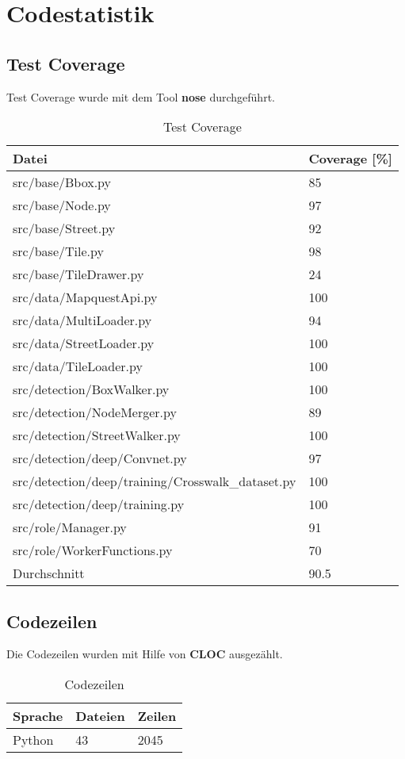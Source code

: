 \section{Codestatistik}
\subsection{Test Coverage}
Test Coverage wurde mit dem Tool \textbf{nose} durchgeführt. \\

\begin{table}[H]
\centering
    \begin{tabular}{|l|l|}
    \hline    
    \rowcolor{lightblue}
	Datei & Coverage [\%] \\ \hline
	src/base/Bbox.py & 85 \\ \hline    
	src/base/Node.py & 97 \\ \hline   
	src/base/Street.py & 92 \\ \hline  
	src/base/Tile.py & 98 \\ \hline   
	src/base/TileDrawer.py & 24 \\ \hline  
	src/data/MapquestApi.py & 100 \\ \hline   
	src/data/MultiLoader.py & 94 \\ \hline   
	src/data/StreetLoader.py & 100 \\ \hline   
	src/data/TileLoader.py & 100 \\ \hline   
	src/detection/BoxWalker.py & 100 \\ \hline   
	src/detection/NodeMerger.py & 89 \\ \hline  
	src/detection/StreetWalker.py & 100 \\ \hline   
	src/detection/deep/Convnet.py & 97 \\ \hline   
	src/detection/deep/training/Crosswalk\_dataset.py & 100 \\ \hline  
	src/detection/deep/training.py & 100 \\ \hline   
	src/role/Manager.py & 91 \\ \hline  
	src/role/WorkerFunctions.py & 70 \\ \hline
	\rowcolor{lightblue}
	Durchschnitt &   90.5 \\ \hline
    \end{tabular}
    \caption[Test Coverage]{Test Coverage}
\end{table}

\subsection{Codezeilen}
Die Codezeilen wurden mit Hilfe von \textbf{CLOC} \cite{CLOC} ausgezählt. \\

\begin{table}[H]
\centering
    \begin{tabular}{|p{3cm} |p{3cm} |p{3cm} |}
    \hline    
    \rowcolor{lightblue}
	Sprache & Dateien & Zeilen  \\ \hline   
	Python & 43 & 2045 \\ \hline
    \end{tabular}
    \caption[Codezeilen]{Codezeilen}
\end{table}

